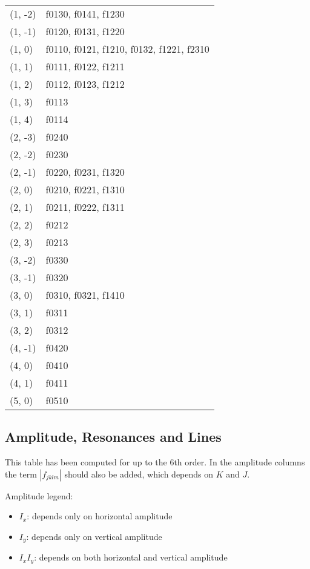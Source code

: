 \documentclass[12pt,a4,]{article}
\numberwithin{equation}{subsection}
\providecommand{\tightlist}{%
  \setlength{\itemsep}{0pt}\setlength{\parskip}{0pt}}
\begin{document}
\begin{longtable}[]{@{}ll@{}}
(1, -2) & f0130, f0141, f1230 \\
(1, -1) & f0120, f0131, f1220 \\
(1, 0) & f0110, f0121, f1210, f0132, f1221, f2310 \\
(1, 1) & f0111, f0122, f1211 \\
(1, 2) & f0112, f0123, f1212 \\
(1, 3) & f0113 \\
(1, 4) & f0114 \\
(2, -3) & f0240 \\
(2, -2) & f0230 \\
(2, -1) & f0220, f0231, f1320 \\
(2, 0) & f0210, f0221, f1310 \\
(2, 1) & f0211, f0222, f1311 \\
(2, 2) & f0212 \\
(2, 3) & f0213 \\
(3, -2) & f0330 \\
(3, -1) & f0320 \\
(3, 0) & f0310, f0321, f1410 \\
(3, 1) & f0311 \\
(3, 2) & f0312 \\
(4, -1) & f0420 \\
(4, 0) & f0410 \\
(4, 1) & f0411 \\
(5, 0) & f0510 \\
\bottomrule()
\end{longtable}

\newpage

\hypertarget{amplitude-resonances-and-lines}{%
\subsection{Amplitude, Resonances and
Lines}\label{amplitude-resonances-and-lines}}

This table has been computed for up to the 6th order. In the amplitude
columns the term \(|f_{jklm}|\) should also be added, which depends on
\(K\) and \(J\).

Amplitude legend:

\begin{itemize}
\tightlist
\item
  \colorbox{orange!20}{$I_x$}: depends only on horizontal amplitude
\item
  \colorbox{red!20}{$I_y$}: depends only on vertical amplitude
\item
  \colorbox{blue!20}{$I_x I_y$}: depends on both horizontal and vertical
  amplitude
\end{itemize}
\end{document}

